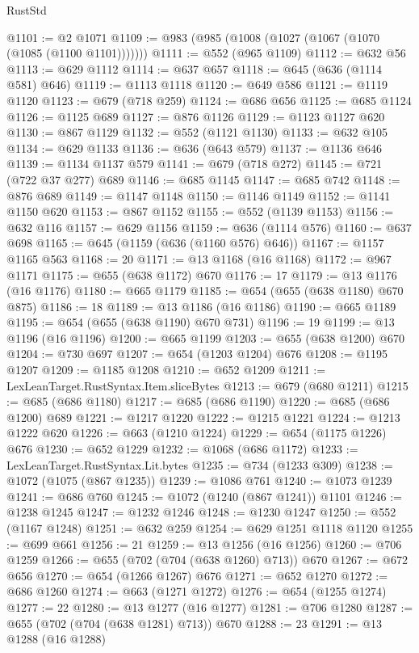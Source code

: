 \begin{lexlean}{RustStd}
\begin{coremodule}
@1101 := @2 @1071
@1109 := @983 (@985 (@1008 (@1027 (@1067 (@1070 (@1085 (@1100 @1101)))))))
@1111 := @552 (@965 @1109)
@1112 := @632 @56
@1113 := @629 @1112
@1114 := @637 @657
@1118 := @645 (@636 (@1114 @581) @646)
@1119 := @1113 @1118
@1120 := @649 @586
@1121 := @1119 @1120
@1123 := @679 (@718 @259)
@1124 := @686 @656
@1125 := @685 @1124
@1126 := @1125 @689
@1127 := @876 @1126
@1129 := @1123 @1127 @620
@1130 := @867 @1129
@1132 := @552 (@1121 @1130)
@1133 := @632 @105
@1134 := @629 @1133
@1136 := @636 (@643 @579)
@1137 := @1136 @646
@1139 := @1134 @1137 @579
@1141 := @679 (@718 @272)
@1145 := @721 (@722 @37 @277) @689
@1146 := @685 @1145
@1147 := @685 @742
@1148 := @876 @689
@1149 := @1147 @1148
@1150 := @1146 @1149
@1152 := @1141 @1150 @620
@1153 := @867 @1152
@1155 := @552 (@1139 @1153)
@1156 := @632 @116
@1157 := @629 @1156
@1159 := @636 (@1114 @576)
@1160 := @637 @698
@1165 := @645 (@1159 (@636 (@1160 @576) @646))
@1167 := @1157 @1165 @563
@1168 := 20
@1171 := @13 @1168 (@16 @1168)
@1172 := @967 @1171
@1175 := @655 (@638 @1172) @670
@1176 := 17
@1179 := @13 @1176 (@16 @1176)
@1180 := @665 @1179
@1185 := @654 (@655 (@638 @1180) @670 @875)
@1186 := 18
@1189 := @13 @1186 (@16 @1186)
@1190 := @665 @1189
@1195 := @654 (@655 (@638 @1190) @670 @731)
@1196 := 19
@1199 := @13 @1196 (@16 @1196)
@1200 := @665 @1199
@1203 := @655 (@638 @1200) @670
@1204 := @730 @697
@1207 := @654 (@1203 @1204) @676
@1208 := @1195 @1207
@1209 := @1185 @1208
@1210 := @652 @1209
@1211 := LexLeanTarget.RustSyntax.Item.sliceBytes
@1213 := @679 (@680 @1211)
@1215 := @685 (@686 @1180)
@1217 := @685 (@686 @1190)
@1220 := @685 (@686 @1200) @689
@1221 := @1217 @1220
@1222 := @1215 @1221
@1224 := @1213 @1222 @620
@1226 := @663 (@1210 @1224)
@1229 := @654 (@1175 @1226) @676
@1230 := @652 @1229
@1232 := @1068 (@686 @1172)
@1233 := LexLeanTarget.RustSyntax.Lit.bytes
@1235 := @734 (@1233 @309)
@1238 := @1072 (@1075 (@867 @1235))
@1239 := @1086 @761
@1240 := @1073 @1239
@1241 := @686 @760
@1245 := @1072 (@1240 (@867 @1241)) @1101
@1246 := @1238 @1245
@1247 := @1232 @1246
@1248 := @1230 @1247
@1250 := @552 (@1167 @1248)
@1251 := @632 @259
@1254 := @629 @1251 @1118 @1120
@1255 := @699 @661
@1256 := 21
@1259 := @13 @1256 (@16 @1256)
@1260 := @706 @1259
@1266 := @655 (@702 (@704 (@638 @1260) @713)) @670
@1267 := @672 @656
@1270 := @654 (@1266 @1267) @676
@1271 := @652 @1270
@1272 := @686 @1260
@1274 := @663 (@1271 @1272)
@1276 := @654 (@1255 @1274)
@1277 := 22
@1280 := @13 @1277 (@16 @1277)
@1281 := @706 @1280
@1287 := @655 (@702 (@704 (@638 @1281) @713)) @670
@1288 := 23
@1291 := @13 @1288 (@16 @1288)

\end{coremodule}
\end{lexlean}
